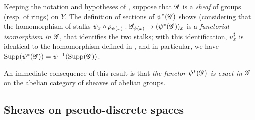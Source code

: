 \begin{env}[3.7.2]
\label{0.3.7.2}
Keeping the notation and hypotheses of , suppose that $\mathscr{G}$
is a \emph{sheaf} of groups (resp. of rings) on $Y$. The definition of sections
of $\psi^*(\mathscr{G})$  shows (considering  that
the homomorphism of stalks
$\psi_x\circ\rho_{\psi(x)}:\sh{G}_{\psi(x)}\to(\psi^*(\sh{G}))_x$ is a
\emph{functorial isomorphism in $\mathscr{G}$}, that identifies the two stalks; with
this identification, $u_x^\sharp$ is identical to the homomorphism defined in
, and in particular, we have
${\mathop{\mathrm{Supp}}\nolimits}(\psi^*(\mathscr{G}))=\psi^{-1}({\mathop{\mathrm{Supp}}\nolimits}(\mathscr{G}))$.

An immediate consequence of this result is that \emph{the functor
$\psi^*(\mathscr{G})$ is exact in $\mathscr{G}$} on the abelian category of sheaves of
abelian groups.
\end{env}

\subsection{Sheaves on pseudo-discrete spaces}
\label{subsection:0.3.8}

